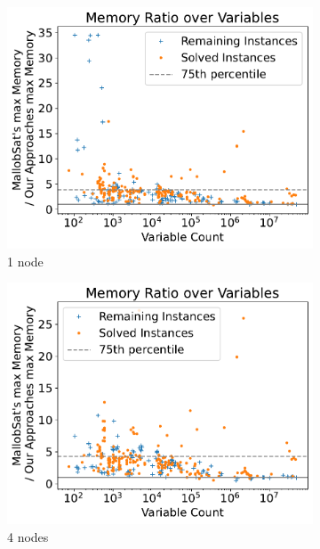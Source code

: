 \documentclass[12pt,a4paper,twoside]{scrartcl}
\numberwithin{equation}{section}
\begin{document}
\begin{figure}[!h]
  \center
  \begin{subfigure}[c]{.45\textwidth}
    \center
    \includegraphics[scale=.45]{plots/1node_compare/mem_ratio_over_vars.pdf}
    \caption{1 node}
    \label{fig:memRatiosVars1node}
  \end{subfigure}
  \begin{subfigure}[c]{.45\textwidth}
    \center
    \includegraphics[scale=.45]{plots/4node_compare/mem_ratio_over_vars.pdf}
    \caption{4 nodes}
    \label{fig:memRatiosVars4node}
  \end{subfigure}
  \begin{subfigure}[c]{.45\textwidth}

\end{subfigure}
\end{figure}
\end{document}
